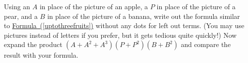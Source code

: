 \documentclass{book}
\begin{document}
\setcounter{project}{236}
\addtocounter{project}{-1}
\begin{activity}[]\label{twopiecesoffruit}
\hypertarget{p-1296}{}%
Using an \(A\) in place of the picture of an apple, a \(P\) in place of the picture of a pear, and a \(B\) in place of the picture of a banana, write out the formula similar to \hyperref[uptothreefruits]{Formula~(\ref{uptothreefruits})} without any dots for left out terms. (You may use pictures instead of letters if you prefer, but it gets tedious quite quickly!) Now expand the product \((A+A^2+A^3)(P+P^2)(B+B^2)\) and compare the result with your formula.%
\end{activity}
\end{document}
